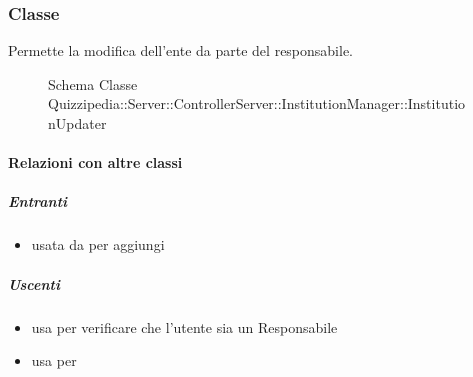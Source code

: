 \subsubsection{Classe }
Permette la modifica dell'ente da parte del responsabile.
\begin{figure}[H]
\centering
\noindent{}
\caption[Schema Classe InstitutionUpdater]{Schema Classe Quizzipedia::Server::ControllerServer::InstitutionManager::InstitutionUpdater}
\end{figure}
\paragraph{Relazioni con altre classi}
\subparagraph{Entranti}
\begin{itemize}
\item usata da  per aggiungi
\end{itemize}
\subparagraph{Uscenti}
\begin{itemize}
\item usa  per verificare che l'utente sia un Responsabile
\item usa  per 
\end{itemize}
